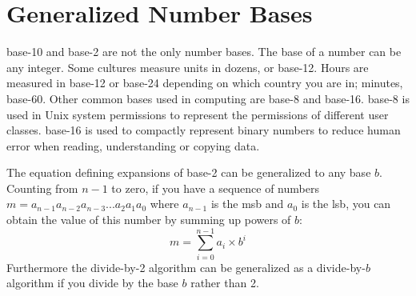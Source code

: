 \begin{figure}[t]
\end{figure}


\section{Generalized Number Bases\label{sec:numbers:bases}}

\Gls{base-10} and \gls{base-2} are not the only number bases. The base of a number can be any 
integer. Some cultures measure units in dozens, or base-12. Hours are measured in base-12 or 
base-24 depending on which country you are in; minutes, base-60. Other common bases used in 
computing are \gls{base-8} and \gls{base-16}. \Gls{base-8} is used in Unix system permissions 
to represent the permissions of different user classes. \Gls{base-16} is used to compactly 
represent binary numbers to reduce human error when reading, understanding or copying data.

The equation defining expansions of \gls{base-2} can be generalized to any base $b$. Counting from $n-1$ 
to zero, if you have a sequence of numbers $m = a_{n-1}a_{n-2}a_{n-3}...a_2a_1a_0$ 
where $a_{n-1}$ is the \gls{msb} and $a_0$ is the \gls{lsb}, you can obtain the value of this number 
by summing up powers of $b$:
%
\begin{equation}\label{eq:basen}
    m = \sum_{i=0}^{n-1} a_i \times b^i
\end{equation}
%
Furthermore the divide-by-2 algorithm can be generalized as a divide-by-$b$ algorithm if you divide by the base $b$ rather than 2.

